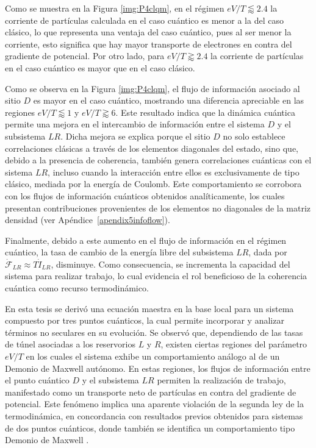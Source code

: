 
Como se muestra en la Figura \ref{img:P4clqm}, en el régimen $eV/T\lessapprox 2.4$ la corriente de partículas calculada en el caso cuántico es menor a la del caso clásico, lo que representa una ventaja del caso cuántico, pues al ser menor la corriente, esto significa que hay mayor transporte de electrones en contra del gradiente de potencial. Por otro lado, para $eV/T \gtrapprox 2.4$ la corriente de partículas en el caso cuántico es mayor que en el caso clásico. 

Como se observa en la Figura \ref{img:P4clqm}, el flujo de información asociado al sitio $D$ es mayor en el caso cuántico, mostrando una diferencia apreciable en las regiones $eV/T \lessapprox 1$ y $eV/T \gtrapprox 6$. Este resultado indica que la dinámica cuántica permite una mejora en el intercambio de información entre el sistema $D$ y el subsistema $LR$. Dicha mejora se explica porque el sitio $D$ no solo establece correlaciones clásicas a través de los elementos diagonales del estado, sino que, debido a la presencia de coherencia, también genera correlaciones cuánticas con el sistema $LR$, incluso cuando la interacción entre ellos es exclusivamente de tipo clásico, mediada por la energía de Coulomb. Este comportamiento se corrobora con los flujos de información cuánticos obtenidos analíticamente, los cuales presentan contribuciones provenientes de los elementos no diagonales de la matriz densidad (ver Apéndice~\ref{apendix5infoflow}).
 

Finalmente, debido a este aumento en el flujo de información en el régimen cuántico, la tasa de cambio de la energía libre del subsistema $LR$, dada por $\dot{\mathcal{F}}_{LR} \approx T\dot{I}_{LR}$, disminuye. Como consecuencia, se incrementa la capacidad del sistema para realizar trabajo, lo cual evidencia el rol beneficioso de la coherencia cuántica como recurso termodinámico.


\label{sec5:demonio}


En esta tesis se derivó una ecuación maestra en la base local para un sistema compuesto por tres puntos cuánticos, la cual permite incorporar y analizar términos no seculares en su evolución. Se observó que, dependiendo de las tasas de túnel asociadas a los reservorios $L$ y $R$, existen ciertas regiones del parámetro $eV/T$ en los cuales el sistema exhibe un comportamiento análogo al de un Demonio de Maxwell autónomo. En estas regiones, los flujos de información entre el punto cuántico $D$ y el subsistema $LR$ permiten la realización de trabajo, manifestado como un transporte neto de partículas en contra del gradiente de potencial. Este fenómeno implica una aparente violación de la segunda ley de la termodinámica, en concordancia con resultados previos obtenidos para sistemas de dos puntos cuánticos, donde también se identifica un comportamiento tipo Demonio de Maxwell \cite{horowitz2014thermodynamics}.

